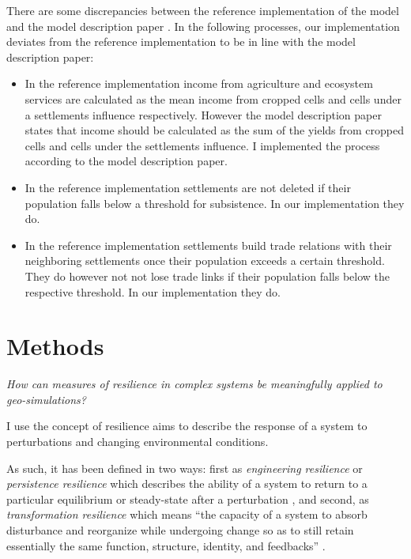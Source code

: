 There are some discrepancies between the reference implementation of the model \cite{Heckbert2013model} and the model description paper \cite{Heckbert2013}. In the following processes, our implementation deviates from the reference implementation to be in line with the model description paper: 

\begin{itemize}
    \item In the reference implementation income from agriculture and ecosystem services are calculated as the mean income from cropped cells and cells under a settlements influence respectively. However the model description paper states that income should be calculated as the sum of the yields from cropped cells and cells under the settlements influence. I implemented the process according to the model description paper.
    \item In the reference implementation settlements are not deleted if their population falls below a threshold for subsistence. In our implementation they do.
    \item In the reference implementation settlements build trade relations with their neighboring settlements once their population exceeds a certain threshold. They do however not not lose trade links if their population falls below the respective threshold. In our implementation they do.
\end{itemize}

\section{Methods}
\textit{How can measures of resilience in complex systems be meaningfully applied to geo-simulations?}

I use the concept of resilience \citep{Holling1973} aims to describe the response of a system to perturbations and changing environmental conditions. 


As such, it has been defined in two ways: 
first as \emph{engineering resilience} or \emph{persistence resilience} which describes the ability of a system to return to a particular equilibrium or steady-state after a perturbation \citep{Holling1973, Gunderson2000}, and
second, as \emph{transformation resilience} which means ``the capacity of a system to absorb disturbance and reorganize while undergoing change so as to still retain essentially the same function, structure, identity, and feedbacks'' \citep{Walker2004}.

